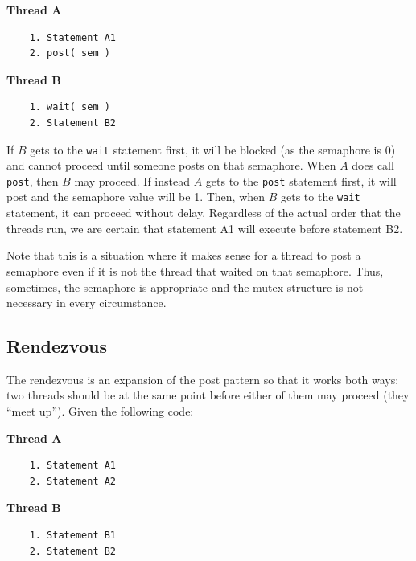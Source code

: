 \documentclass[a4paper]{report}
\begin{document}
\begin{multicols}{2}
	\textbf{Thread A}\vspace{-2em}
	\begin{verbatim}
	1. Statement A1
	2. post( sem )
  \end{verbatim}
	\columnbreak
	\textbf{Thread B}\vspace{-2em}
	\begin{verbatim}
	1. wait( sem )
	2. Statement B2
  \end{verbatim}
\end{multicols}
\vspace{-2em}

If $B$ gets to the \texttt{wait} statement first, it will be blocked (as the semaphore is 0) and cannot proceed until someone posts on that semaphore. When $A$ does call \texttt{post}, then $B$ may proceed. If instead $A$ gets to the \texttt{post} statement first, it will post and the semaphore value will be 1. Then, when $B$ gets to the \texttt{wait} statement, it can proceed without delay. Regardless of the actual order that the threads run, we are certain that statement A1 will execute before statement B2.

Note that this is a situation where it makes sense for a thread to post a semaphore even if it is not the thread that waited on that semaphore. Thus, sometimes, the semaphore is appropriate and the mutex structure is not necessary in every circumstance.

\subsection*{Rendezvous}
The rendezvous is an expansion of the post pattern so that it works both ways: two threads should be at the same point before either of them may proceed (they ``meet up''). Given the following code:

\begin{multicols}{2}
	\textbf{Thread A}\vspace{-2em}
	\begin{verbatim}
	1. Statement A1
	2. Statement A2
  \end{verbatim}
	\columnbreak
	\textbf{Thread B}\vspace{-2em}
	\begin{verbatim}
	1. Statement B1
	2. Statement B2
  \end{verbatim}
\end{multicols}
\vspace{-2em}
\end{document}

